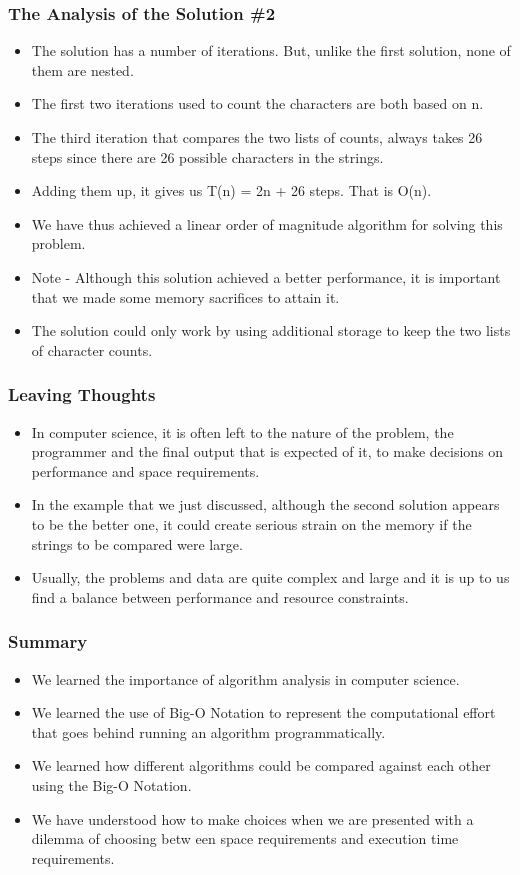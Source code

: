 \documentclass{beamer}
\begin{document}
\begin{frame}
\frametitle{The Analysis of the Solution 
\#2}
\begin{itemize}
\item The solution has a number of iterations. But, unlike the first solution, none of them
are nested. 
\item The first two iterations used to count the characters are both based on n.
\item The third iteration that compares the two lists of counts, always takes 26 steps since there are 26 possible characters in the strings.
\item Adding them up, it gives us T(n) = 2n + 26 steps. That is O(n).
\item We have thus achieved a linear order of magnitude algorithm for solving this problem.
\item Note - Although this solution achieved a better performance, it is important that we made some memory sacrifices to attain it.
\item The solution could only work by using additional storage to keep the two lists of character counts.
\end{itemize}
\end{frame}

\begin{frame}
\frametitle{Leaving Thoughts}
\begin{itemize}
\item In computer science, it is often left to the nature of the problem, the programmer and the final output that is expected of it, to make decisions on performance and space requirements.
\item In the example that we just discussed, although the second solution appears to be the better one, it could create serious strain on the memory if the strings to be compared were large.
\item Usually, the problems and data are quite complex and large and it is up to us find a balance between performance and resource constraints.
\end{itemize}
\end{frame}

\begin{frame}
\frametitle{Summary}
\begin{itemize}
\item We learned the importance of algorithm analysis in computer science.
\item We learned the use of Big-O Notation to represent the computational effort that goes behind running an algorithm programmatically.
\item We learned how different algorithms could be compared against each other using the Big-O Notation.
\item We have understood how to make choices when we are presented with a dilemma of choosing betw	een space requirements and execution time requirements.
\end{itemize}
\end{frame}
\end{document}
